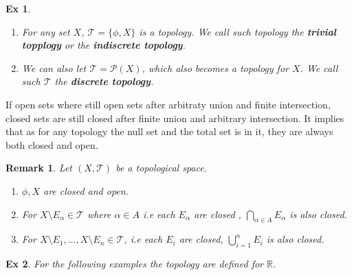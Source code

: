 \documentclass[paper=a4, fontsize=11pt]{scrartcl}
\newcommand{\T}{\mathcal{T}}
\newcommand{\nextline}{$ $ \newline \vspace{-0.15in}}
\newtheorem{example}{Ex}
\newtheorem*{remark}{Remark}
\begin{document}
\begin{example}
\nextline
\begin{enumerate}[label=\arabic*)]
	\item For any set $X$, $\T = \{ \phi, X \}$ is a topology. We call such topology the \textbf{trivial topplogy} or the \textbf{indiscrete topology}.
	\item We can also let $\T = \mathcal{P}(X)$, which also becomes a topology for $X$. We call such $\T$ the \textbf{discrete topology}.\\
\end{enumerate}
\end{example}

If open sets where still open sets after arbitraty union and finite intersection, closed sets are still closed after finite union and arbitrary intersection. It implies that as for any topology the null set and the total set is in it, they are always both closed and open.\\

\begin{remark}
	Let $(X,\T)$ be a topological space.
	\begin{enumerate}
		\item $\phi,X$ are closed and open.
		\item For $X\setminus E_\alpha \in \T$ where $\alpha\in A$ i.e each $E_\alpha$ are closed ,  $\bigcap\limits_{\alpha \in A} E_\alpha$ is also closed.
		\item For $X\setminus E_1 , \dots , X\setminus E_n \in \T$, i.e each $E_i$ are closed, $\bigcup\limits_{i=1}^n E_i$ is also closed.
	\end{enumerate}
\end{remark}

\vspace{0.15in}

\begin{example}
For the following examples the topology are defined for $\mathbb{R}$.
\end{example}
\end{document}
